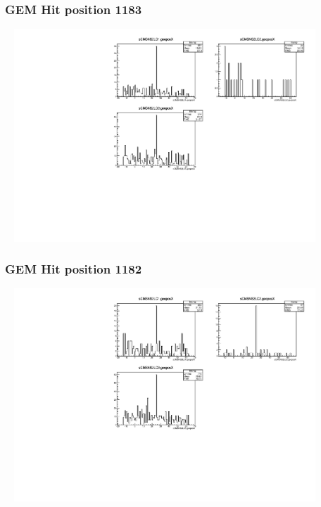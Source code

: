 \documentclass[slidestop,compress,mathserif]{beamer}
\begin{document}
\begin{frame}\frametitle{GEM Hit position 1183}
	 \includegraphics[width=12cm,height=8cm]{GEM_Hit_position_1183.pdf}
\end{frame}
\begin{frame}\frametitle{GEM Hit position 1182}
	 \includegraphics[width=12cm,height=8cm]{GEM_Hit_position_1182.pdf}
\end{frame}
\end{document}
